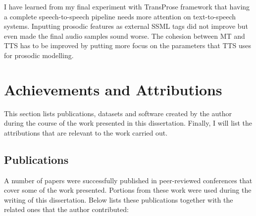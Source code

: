 I have learned from my final experiment with TransProse framework that having a complete speech-to-speech pipeline needs more attention on text-to-speech systems. Inputting prosodic features as external SSML tags did not improve but even made the final audio samples sound worse. The cohesion between MT and TTS has to be improved by putting more focus on the parameters that TTS uses for prosodic modelling.

\section{Achievements and Attributions}
\label{conclusions:achievements}

This section lists publications, datasets and software created by the author during the course of the work presented in this dissertation. Finally, I will list the attributions that are relevant to the work carried out. 

\subsection{Publications}
\label{conclusions:publications}
A number of papers were successfully published in peer-reviewed conferences that cover some of the work presented. Portions from these work were used during the writing of this dissertation. Below lists these publications together with the related ones that the author contributed:

